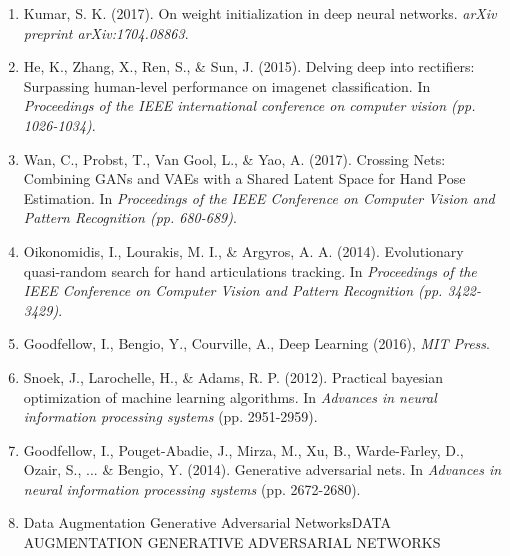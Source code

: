 \documentclass{article}
\begin{document}
\begin{enumerate}
\item Kumar, S. K. (2017). On weight initialization in deep neural networks. \emph{arXiv preprint arXiv:1704.08863}.
\item He, K., Zhang, X., Ren, S., \& Sun, J. (2015). Delving deep into rectifiers: Surpassing human-level performance on imagenet classification. In \emph{Proceedings of the IEEE international conference on computer vision (pp. 1026-1034)}.
\item Wan, C., Probst, T., Van Gool, L., \& Yao, A. (2017). Crossing Nets: Combining GANs and VAEs with a Shared Latent Space for Hand Pose Estimation. In \emph{Proceedings of the IEEE Conference on Computer Vision and Pattern Recognition (pp. 680-689)}.
\item Oikonomidis, I., Lourakis, M. I., \& Argyros, A. A. (2014). Evolutionary quasi-random search for hand articulations tracking. In \emph{Proceedings of the IEEE Conference on Computer Vision and Pattern Recognition (pp. 3422-3429)}.
\item Goodfellow, I., Bengio, Y., Courville, A., Deep Learning (2016), \emph{MIT Press}.
\item Snoek, J., Larochelle, H., \& Adams, R. P. (2012). Practical bayesian optimization of machine learning algorithms. In \emph{Advances in neural information processing systems} (pp. 2951-2959).
\item Goodfellow, I., Pouget-Abadie, J., Mirza, M., Xu, B., Warde-Farley, D., Ozair, S., ... \& Bengio, Y. (2014). Generative adversarial nets. In \emph{Advances in neural information processing systems} (pp. 2672-2680).
\item Data Augmentation Generative Adversarial NetworksDATA AUGMENTATION GENERATIVE ADVERSARIAL
NETWORKS
\end{enumerate}
\end{document}
